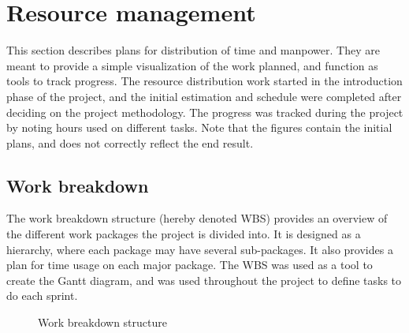 \section{Resource management}
\label{sec:process_and_methodology-resource_management}

This section describes plans for distribution of time and manpower. They are meant to provide a simple visualization of the work planned, and function as tools to track progress. The resource distribution work started in the introduction phase of the project, and the initial estimation and schedule were completed after deciding on the project methodology. The progress was tracked during the project by noting hours used on different tasks. Note that the figures contain the initial plans, and does not correctly reflect the end result.

\subsection{Work breakdown}
\label{subsec:process_and_methodology-resource_management-work_breakdown}

The work breakdown structure (hereby denoted WBS) provides an overview of the different work packages the project is divided into. It is designed as a hierarchy, where each package may have several sub-packages. It also provides a plan for time usage on each major package. The WBS was used as a tool to create the Gantt diagram, and was used throughout the project to define tasks to do each sprint.

\begin{center}
  \begin{figure}[ht!]
    \caption{Work breakdown structure}
    \label{fig:Work breakdown structure}
  \end{figure}
\end{center}

